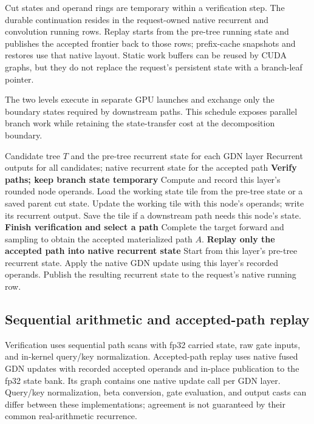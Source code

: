 \documentclass[conference]{IEEEtran}
\begin{document}
Cut states and operand rings are temporary within a verification step. The durable continuation resides in the request-owned native recurrent and convolution running rows. Replay starts from the pre-tree running state and publishes the accepted frontier back to those rows; prefix-cache snapshots and restores use that native layout. Static work buffers can be reused by CUDA graphs, but they do not replace the request's persistent state with a branch-leaf pointer.

The two levels execute in separate GPU launches and exchange only the boundary states required by downstream paths. This schedule exposes parallel branch work while retaining the state-transfer cost at the decomposition boundary.

\begin{algorithm*}[t]
\caption{Path-parallel scan and accepted-path replay}
\label{alg:scan-replay}
\normalsize\linespread{1.08}\selectfont\raggedright
\begin{algorithmic}[1]
\Require Candidate tree $T$ and the pre-tree recurrent state for each GDN layer
\Ensure Recurrent outputs for all candidates; native recurrent state for the accepted path
\Statex \textbf{Verify paths; keep branch state temporary}
  \State Compute and record this layer's rounded node operands.
      \State Load the working state tile from the pre-tree state or a saved parent cut state.
        \State Update the working tile with this node's operands; write its recurrent output.
        \State Save the tile if a downstream path needs this node's state.
      \EndFor
    \EndParallelFor
  \EndFor
\EndFor
\Statex \textbf{Finish verification and select a path}
\State Complete the target forward and sampling to obtain the accepted materialized path $A$.
\Statex \textbf{Replay only the accepted path into native recurrent state}
  \State Start from this layer's pre-tree recurrent state.
    \State Apply the native GDN update using this layer's recorded operands.
  \EndFor
  \State Publish the resulting recurrent state to the request's native running row.
\EndFor
\end{algorithmic}
\end{algorithm*}

\subsection{Sequential arithmetic and accepted-path replay}
\label{sec:reconstruction-numerics}
Verification uses sequential path scans with fp32 carried state, raw gate inputs, and in-kernel query/key normalization. Accepted-path replay uses native fused GDN updates with recorded accepted operands and in-place publication to the fp32 state bank. Its graph contains one native update call per GDN layer. Query/key normalization, beta conversion, gate evaluation, and output casts can differ between these implementations; agreement is not guaranteed by their common real-arithmetic recurrence.
\end{document}
